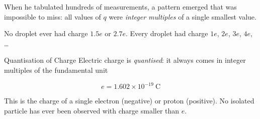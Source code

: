 \documentclass[12pt, a4paper]{book}
\theoremstyle{definition}
\newcommand{\newterm}[1]{\textit{\textcolor{DiscoveryColor}{#1}}}
\begin{document}
When he tabulated hundreds of measurements,
a pattern emerged that was impossible to miss:
all values of $q$ were \emph{integer multiples} of
a single smallest value.

No droplet ever had charge $1.5e$ or $2.7e$.
Every droplet had charge $1e$, $2e$, $3e$, $4e$, \ldots

\begin{namedconcept}{Quantisation of Charge}
Electric charge is \newterm{quantised}:
it always comes in integer multiples of the fundamental unit

\[
  e = 1.602 \times 10^{-19}\ \si{\coulomb}
\]

This is the charge of a single electron (negative)
or proton (positive).
No isolated particle has ever been observed
with charge smaller than $e$.
\end{namedconcept}
\end{document}
